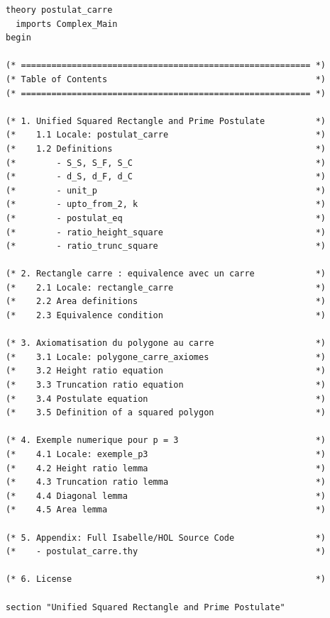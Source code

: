 \documentclass[12pt,a4paper]{article}
\begin{document}
\begin{verbatim}
theory postulat_carre
  imports Complex_Main
begin

(* ========================================================= *)
(* Table of Contents                                         *)
(* ========================================================= *)

(* 1. Unified Squared Rectangle and Prime Postulate          *)
(*    1.1 Locale: postulat_carre                             *)
(*    1.2 Definitions                                        *)
(*        - S_S, S_F, S_C                                    *)
(*        - d_S, d_F, d_C                                    *)
(*        - unit_p                                           *)
(*        - upto_from_2, k                                   *)
(*        - postulat_eq                                      *)
(*        - ratio_height_square                              *)
(*        - ratio_trunc_square                               *)

(* 2. Rectangle carre : equivalence avec un carre            *)
(*    2.1 Locale: rectangle_carre                            *)
(*    2.2 Area definitions                                   *)
(*    2.3 Equivalence condition                              *)

(* 3. Axiomatisation du polygone au carre                    *)
(*    3.1 Locale: polygone_carre_axiomes                     *)
(*    3.2 Height ratio equation                              *)
(*    3.3 Truncation ratio equation                          *)
(*    3.4 Postulate equation                                 *)
(*    3.5 Definition of a squared polygon                    *)

(* 4. Exemple numerique pour p = 3                           *)
(*    4.1 Locale: exemple_p3                                 *)
(*    4.2 Height ratio lemma                                 *)
(*    4.3 Truncation ratio lemma                             *)
(*    4.4 Diagonal lemma                                     *)
(*    4.5 Area lemma                                         *)

(* 5. Appendix: Full Isabelle/HOL Source Code                *)
(*    - postulat_carre.thy                                   *)

(* 6. License                                                *)

section "Unified Squared Rectangle and Prime Postulate"


\end{verbatim}
\end{document}
